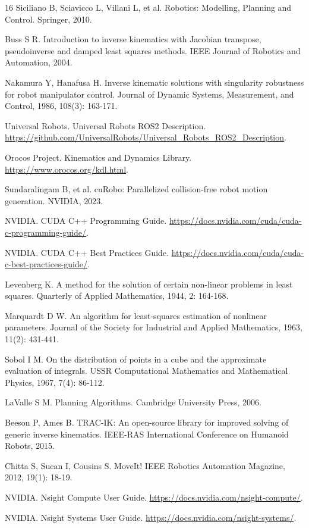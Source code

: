 \documentclass[twocolumn,a4paper,10pt]{ctexart}
\begin{document}
\begin{thebibliography}{16}
Siciliano B, Sciavicco L, Villani L, et al. Robotics: Modelling, Planning and Control. Springer, 2010.

Buss S R. Introduction to inverse kinematics with Jacobian transpose, pseudoinverse and damped least squares methods. IEEE Journal of Robotics and Automation, 2004.

Nakamura Y, Hanafusa H. Inverse kinematic solutions with singularity robustness for robot manipulator control. Journal of Dynamic Systems, Measurement, and Control, 1986, 108(3): 163-171.

Universal Robots. Universal Robots ROS2 Description. \url{https://github.com/UniversalRobots/Universal_Robots_ROS2_Description}.

Orocos Project. Kinematics and Dynamics Library. \url{https://www.orocos.org/kdl.html}.

Sundaralingam B, et al. cuRobo: Parallelized collision-free robot motion generation. NVIDIA, 2023.

NVIDIA. CUDA C++ Programming Guide. \url{https://docs.nvidia.com/cuda/cuda-c-programming-guide/}.

NVIDIA. CUDA C++ Best Practices Guide. \url{https://docs.nvidia.com/cuda/cuda-c-best-practices-guide/}.

Levenberg K. A method for the solution of certain non-linear problems in least squares. Quarterly of Applied Mathematics, 1944, 2: 164-168.

Marquardt D W. An algorithm for least-squares estimation of nonlinear parameters. Journal of the Society for Industrial and Applied Mathematics, 1963, 11(2): 431-441.

Sobol I M. On the distribution of points in a cube and the approximate evaluation of integrals. USSR Computational Mathematics and Mathematical Physics, 1967, 7(4): 86-112.

LaValle S M. Planning Algorithms. Cambridge University Press, 2006.

Beeson P, Ames B. TRAC-IK: An open-source library for improved solving of generic inverse kinematics. IEEE-RAS International Conference on Humanoid Robots, 2015.

Chitta S, Sucan I, Cousins S. MoveIt! IEEE Robotics Automation Magazine, 2012, 19(1): 18-19.

NVIDIA. Nsight Compute User Guide. \url{https://docs.nvidia.com/nsight-compute/}.

NVIDIA. Nsight Systems User Guide. \url{https://docs.nvidia.com/nsight-systems/}.
\end{thebibliography}
\end{document}
